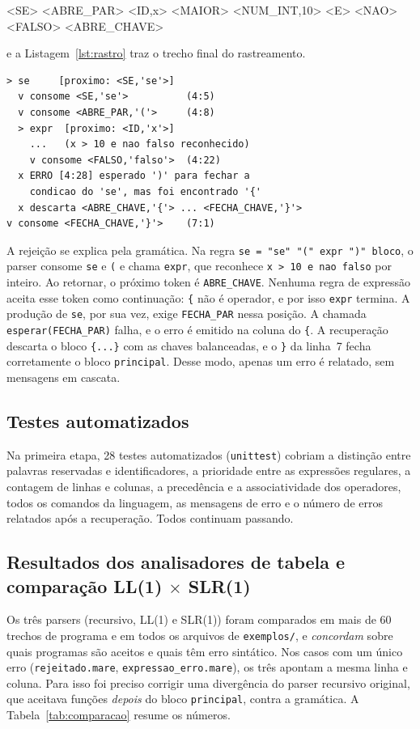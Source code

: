 \documentclass[conference]{IEEEtran}
\begin{document}
\smallskip
{\scriptsize\ttfamily <SE> <ABRE\_PAR> <ID,x> <MAIOR> <NUM\_INT,10> <E> <NAO> <FALSO> <ABRE\_CHAVE>}
\smallskip

\noindent e a Listagem~\ref{lst:rastro} traz o trecho final do rastreamento.

\begin{lstlisting}[style=ebnf,caption={Trecho do rastreamento de \texttt{rejeitado.mare}.},label=lst:rastro]
> se     [proximo: <SE,'se'>]
  v consome <SE,'se'>          (4:5)
  v consome <ABRE_PAR,'('>     (4:8)
  > expr  [proximo: <ID,'x'>]
    ...   (x > 10 e nao falso reconhecido)
    v consome <FALSO,'falso'>  (4:22)
  x ERRO [4:28] esperado ')' para fechar a
    condicao do 'se', mas foi encontrado '{'
  x descarta <ABRE_CHAVE,'{'> ... <FECHA_CHAVE,'}'>
v consome <FECHA_CHAVE,'}'>    (7:1)
\end{lstlisting}

A rejeição se explica pela gramática. Na regra
\texttt{se = "se" "(" expr ")" bloco}, o parser consome \texttt{se} e
\texttt{(} e chama \texttt{expr}, que reconhece
\texttt{x > 10 e nao falso} por inteiro. Ao retornar, o próximo token é
\texttt{ABRE\_CHAVE}. Nenhuma regra de expressão aceita esse token como
continuação: \texttt{\{} não é operador, e por isso \texttt{expr} termina.
A produção de \texttt{se}, por sua vez, exige \texttt{FECHA\_PAR} nessa
posição. A chamada \texttt{esperar(FECHA\_PAR)} falha, e o erro é emitido na
coluna do \texttt{\{}. A recuperação descarta o bloco \texttt{\{...\}} com as
chaves balanceadas, e o \texttt{\}} da linha~7 fecha corretamente o bloco
\texttt{principal}. Desse modo, apenas um erro é relatado, sem mensagens em
cascata.

\subsection{Testes automatizados}
Na primeira etapa, 28 testes automatizados (\texttt{unittest}) cobriam a distinção entre
palavras reservadas e identificadores, a prioridade entre as expressões
regulares, a contagem de linhas e colunas, a precedência e a associatividade
dos operadores, todos os comandos da linguagem, as mensagens de erro e o
número de erros relatados após a recuperação. Todos continuam passando.

\subsection{Resultados dos analisadores de tabela e comparação LL(1) $\times$ SLR(1)}
Os três parsers (recursivo, LL(1) e SLR(1)) foram comparados em mais de 60
trechos de programa e em todos os arquivos de \texttt{exemplos/}, e
\emph{concordam} sobre quais programas são aceitos e quais têm erro sintático.
Nos casos com um único erro (\texttt{rejeitado.mare}, \texttt{expressao\_erro.mare}),
os três apontam a mesma linha e coluna. Para isso foi preciso corrigir uma
divergência do parser recursivo original, que aceitava funções \emph{depois}
do bloco \texttt{principal}, contra a gramática. A Tabela~\ref{tab:comparacao}
resume os números.
\end{document}
